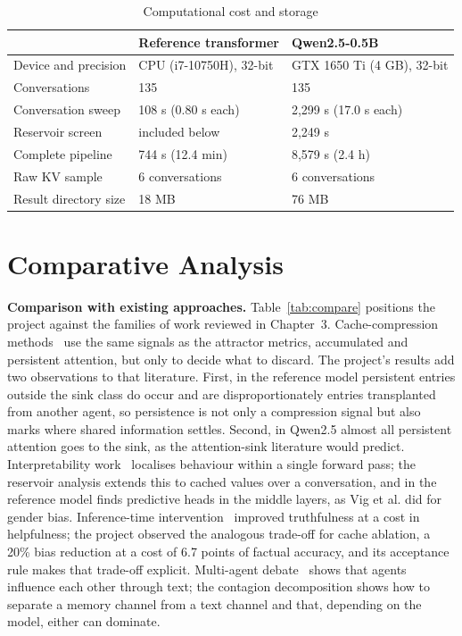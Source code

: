 \begin{table}[htbp]
\centering
\caption{Computational cost and storage}\label{tab:perf}
\small
\begin{tabular}{@{}lll@{}}
\toprule
 & \textbf{Reference transformer} & \textbf{Qwen2.5-0.5B} \\
\midrule
Device and precision & CPU (i7-10750H), 32-bit & GTX 1650 Ti (4 GB), 32-bit \\
Conversations & 135 & 135 \\
Conversation sweep & 108 s (0.80 s each) & 2,299 s (17.0 s each) \\
Reservoir screen & included below & 2,249 s \\
Complete pipeline & 744 s (12.4 min) & 8,579 s (2.4 h) \\
Raw KV sample & 6 conversations & 6 conversations \\
Result directory size & 18 MB & 76 MB \\
\bottomrule
\end{tabular}
\end{table}

\section{Comparative Analysis}
\textbf{Comparison with existing approaches.} Table~\ref{tab:compare} positions the project against the families of work reviewed in Chapter~3. Cache-compression methods~\cite{xiao2024sinks,zhang2023h2o,liu2023scissorhands,oren2024msrnn} use the same signals as the attractor metrics, accumulated and persistent attention, but only to decide what to discard. The project's results add two observations to that literature. First, in the reference model persistent entries outside the sink class do occur and are disproportionately entries transplanted from another agent, so persistence is not only a compression signal but also marks where shared information settles. Second, in Qwen2.5 almost all persistent attention goes to the sink, as the attention-sink literature would predict. Interpretability work~\cite{vig2020causal,meng2022rome,todd2024fv} localises behaviour within a single forward pass; the reservoir analysis extends this to cached values over a conversation, and in the reference model finds predictive heads in the middle layers, as Vig et al. did for gender bias. Inference-time intervention~\cite{li2023iti} improved truthfulness at a cost in helpfulness; the project observed the analogous trade-off for cache ablation, a 20\% bias reduction at a cost of 6.7 points of factual accuracy, and its acceptance rule makes that trade-off explicit. Multi-agent debate~\cite{du2024debate} shows that agents influence each other through text; the contagion decomposition shows how to separate a memory channel from a text channel and that, depending on the model, either can dominate.


